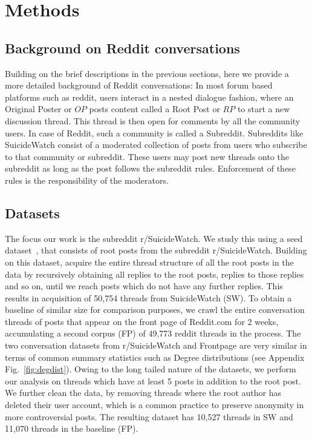 \section{Methods}
\label{section:methods}


 
\subsection{Background on Reddit conversations}
Building on the brief descriptions in the previous sections, here we provide a more detailed background of Reddit conversations: In most forum based platforms such as reddit,  users interact in a nested dialogue fashion, where an Original Poster or $OP$ posts content called a Root Post or $RP$ to start  a new discussion thread. This thread is then open for comments by all the community users. In case of Reddit, such a community is called a Subreddit. Subreddits like SuicideWatch consist of a moderated collection of posts from users who subscribe to that community or subreddit. These users may post new threads onto the subreddit as long as the post follows the subreddit rules. Enforcement of these rules is the responsibility of the moderators. %

\subsection{Datasets} \label{sec:data}
The focus our work is the subreddit r/SuicideWatch. We study this using a seed dataset~\cite{gkotsis2017characterisation}, that consists of root posts from the subreddit r/SuicideWatch. Building on this dataset, acquire the entire thread structure of all the root posts in the data by recursively obtaining all replies to the root posts, replies to those replies and so on, until we reach posts which do not have any further replies. This results in acquisition of 50,754 threads from SuicideWatch (SW). To obtain a baseline of similar size for comparison purposes, we crawl the entire conversation threads of posts that appear on the front page of Reddit.com  for 2 weeks,  accumulating a second corpus (FP) of 49,773 reddit threads in the process. 
%
The two conversation datasets from r/SuicideWatch and Frontpage are very similar in terms of common summary statistics such as Degree distributions (see Appendix Fig.~\ref{fig:degdist}). 
Owing to the long tailed nature of the datasets, we perform our analysis on threads  which have at least 5 posts in addition to the root post.
We further clean the data, by removing threads where the root author has deleted their user account, which is a common practice to preserve anonymity in more controversial posts. The resulting dataset has 10,527 threads in SW and 11,070 threads in the baseline (FP). 


